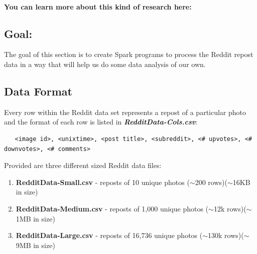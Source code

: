 \documentclass{article}
\begin{document}

\-\ \\\textbf{You can learn more about this kind of research here:} \href{http://i.stanford.edu/~julian/pdfs/icwsm13.pdf}{\color{blue}{http://i.stanford.edu/~julian/pdfs/icwsm13.pdf}}


\subsection*{Goal:} The goal of this section is to create Spark programs to process the Reddit repost data in a way that will help us do some data analysis of our own.

\subsection*{Data Format}
Every row within the Reddit data set represents a repost of a particular photo and the format of each row is listed in \textbf{\textit{RedditData-Cols.csv}}:


\small
\begin{verbatim}
   <image id>, <unixtime>, <post title>, <subreddit>, <# upvotes>, <# downvotes>, <# comments>
\end{verbatim}
\normalsize


\noindent Provided are three different sized Reddit data files:
\begin{enumerate}
    \item \textbf{RedditData-Small.csv} - reposts of 10 unique photos ($\sim$200 rows)($\sim$16KB in size)
    \item \textbf{RedditData-Medium.csv} - reposts of 1,000 unique photos ($\sim$12k rows)($\sim$1MB in size)
    \item \textbf{RedditData-Large.csv} - reposts of 16,736 unique photos ($\sim$130k rows)($\sim$9MB in size)
\end{enumerate}
\end{document}
